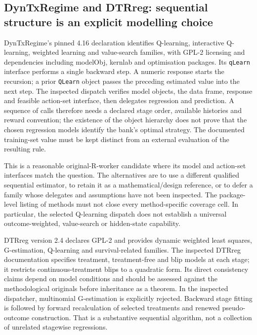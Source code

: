 \subsection{DynTxRegime and DTRreg: sequential structure is an explicit modelling choice}
DynTxRegime's pinned 4.16 declaration identifies Q-learning, interactive Q-learning,
weighted learning and value-search families, with GPL-2 licensing and dependencies
including modelObj, kernlab and optimisation packages. Its \texttt{qLearn} interface
performs a single backward step. A numeric response starts the recursion; a prior
\texttt{QLearn} object passes the preceding estimated value into the next step.
The inspected dispatch verifies model objects, the data frame, response and feasible
action-set interface, then delegates regression and prediction. A sequence of calls
therefore needs a declared stage order, available histories and reward convention;
the existence of the object hierarchy does not prove that the chosen regression
models identify the bank's optimal strategy. The documented training-set value
must be kept distinct from an external evaluation of the resulting rule.
\citep{exec24_policiesr_dyntx}

This is a reasonable original-R-worker candidate where its model and action-set
interfaces match the question. The alternatives are to use a different qualified
sequential estimator, to retain it as a mathematical/design reference, or to defer
a family whose delegates and assumptions have not been inspected. The package-level
listing of methods must not close every method-specific coverage cell. In particular,
the selected Q-learning dispatch does not establish a universal outcome-weighted,
value-search or hidden-state capability.

DTRreg version 2.4 declares GPL-2 and provides dynamic weighted least squares,
G-estimation, Q-learning and survival-related families. The inspected DTRreg
documentation specifies treatment, treatment-free and blip models at each stage;
it restricts continuous-treatment blips to a quadratic form. Its direct consistency
claims depend on model conditions and should be assessed against the methodological
originals before inheritance as a theorem. In the inspected dispatcher, multinomial
G-estimation is explicitly rejected. Backward stage fitting is followed by forward
recalculation of selected treatments and renewed pseudo-outcome construction.
That is a substantive sequential algorithm, not a collection of unrelated stagewise
regressions.~\citep{exec24_policiesr_dtrreg}

